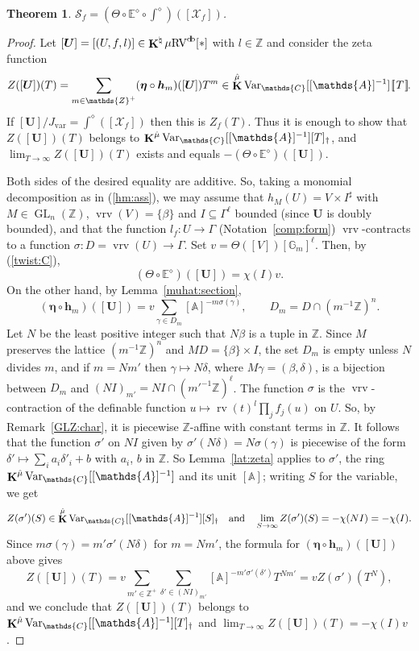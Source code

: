 \documentclass[12pt]{amsart}
\theoremstyle{plain}
\newtheorem{thm}{Theorem}[section]
\theoremstyle{definition}
\theoremstyle{remark}
\numberwithin{equation}{section}
\theoremstyle{plain}
\newcommand{\RV}{\textup{RV}}
\DeclareMathOperator{\GL}{GL}
\newcommand{\Z}{\mathds{Z}}
\newcommand{\A}{\mathds{A}}
\newcommand{\C}{\mathds{C}}
\newcommand{\G}{\mathds{G}}
\newcommand{\0}{\emptyset}
\newcommand{\dbra}[1]{%
  \,[\mkern-6.8mu[\, #1 \,]\mkern-6.8mu]}
\newcommand{\mdl}[1]{\mathcal{#1}}  %
\newcommand{\bb}[1]{\mathbb{#1}}
\newcommand{\limplies}{\rightarrow}
\newcommand{\fun}{\longrightarrow}
\newcommand{\efun}{\longmapsto}
\newcommand{\sub}{\subseteq}
\newcommand{\mgRV}{{\mu}{\RV}}
\DeclareMathOperator{\rv}{rv}
\DeclareMathOperator{\ggk}{\mathbf{K}}
\DeclareMathOperator{\vrv}{vrv}
\DeclareMathOperator{\db}{d \! b}
\newcommand{\var}{\textup{Var}}
\newcommand{\gmv}{\ggk^{\hat \mu}\var_{\C}}
\begin{document}
\begin{thm}\label{direct:mil}
$\mathscr S_f = (\Theta \circ \bb E^{\diamond} \circ \int^{\diamond})([\mdl X_f])$.
\end{thm}
\begin{proof}
Let $[\bm U] = [(U, f, l)] \in \ggk^\natural \mgRV^{\db}[*]$ with $l \in \Z$  and consider the zeta function
\begin{equation}\label{U:zeta}
Z([\bm U])(T) = \sum_{m \in \Z^+} (\bm \eta \circ \bm h_m)([\bm U]) T^m \in \gmv[[\A]^{-1}]\dbra T.
\end{equation}
If $[\bm U] / J_{\mathrm{var}} = \int^{\diamond}([\mdl X_f])$ then this is $Z_f(T)$. Thus it is enough to show that  $Z([\bm U])(T)$ belongs to $\gmv[[\A]^{-1}][T]_{\dag}$, and $\lim_{T \limplies \infty} Z([\bm U])(T)$ exists and equals $- (\Theta \circ \bb E^{\diamond})([\bm U])$.

Both sides of the desired equality are additive. So, taking a monomial decomposition as in (\ref{hm:ass}), we may assume that $h_M(U) = V \times I^\sharp$ with $M \in \GL_n(\Z)$, $\vrv(V) = \{\beta\}$ and $I \sub \Gamma^\ell$ bounded (since $\bm U$ is doubly bounded), and that the function $l_f: U \fun \Gamma$ (Notation~\ref{comp:form}) $\vrv$-contracts to a function $\sigma : D = \vrv(U) \fun \Gamma$.  Set $v = \Theta([V]) [\G_m]^\ell$. Then, by (\ref{twist:C}),
\[
(\Theta \circ \bb E^{\diamond})([\bm U]) = \chi(I) v.
\]
On the other hand, by Lemma~\ref{muhat:section},
\[
(\bm \eta \circ \bm h_m)([\bm U]) = v \sum_{\gamma \in D_m} [\A]^{-m \sigma(\gamma)}, \qquad D_m = D \cap (m^{-1}\Z)^n.
\]
Let $N$ be the least positive integer such that $N \beta$ is a tuple in $\Z$. Since $M$ preserves the lattice $(m^{-1}\Z)^n$ and $M D = \{\beta\} \times I$, the set $D_m$ is empty unless $N$ divides $m$, and if $m = N m'$ then $\gamma \efun N \delta$, where $M \gamma = (\beta, \delta)$, is a bijection between $D_m$ and $(N I)_{m'} = N I \cap (m'^{-1}\Z)^\ell$. The function $\sigma$ is the $\vrv$-contraction of the definable function $u \efun \rv(t)^l \prod_j f_j(u)$ on $U$. So, by Remark~\ref{GLZ:char}, it is piecewise $\Z$-affine with constant terms in $\Z$. It follows that the function $\sigma'$ on $N I$ given by $\sigma'(N \delta) = N \sigma(\gamma)$ is piecewise of the form $\delta' \efun \sum_i a_i \delta'_i + b$ with $a_i$, $b$ in $\Z$. So Lemma~\ref{lat:zeta} applies to $\sigma'$, the ring $\gmv[[\A]^{-1}]$ and its unit $[\A]$; writing $S$ for the variable, we get
\[
Z(\sigma')(S) \in \gmv[[\A]^{-1}][S]_{\dag} \quad \text{and} \quad \lim_{S \limplies \infty}Z(\sigma')(S) = -\chi(N I) = - \chi(I).
\]
Since $m \sigma(\gamma) = m' \sigma'(N \delta)$ for $m = N m'$, the formula for $(\bm \eta \circ \bm h_m)([\bm U])$ above gives
\[
Z([\bm U])(T) = v \sum_{m' \in \Z^+} \sum_{\delta' \in (N I)_{m'}} [\A]^{-m' \sigma'(\delta')} T^{N m'} = v Z(\sigma')(T^N),
\]
and we conclude that $Z([\bm U])(T)$ belongs to $\gmv[[\A]^{-1}][T]_{\dag}$ and $\lim_{T \limplies \infty}Z([\bm U])(T) = - \chi(I) v$.
\end{proof}
\end{document}
